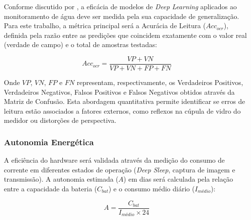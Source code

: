 Conforme discutido por , a eficácia de modelos de \textit{Deep Learning} aplicados ao monitoramento de água deve ser medida pela sua capacidade de generalização. 
Para este trabalho, a métrica principal será a Acurácia de Leitura ($Acc_{ocr}$), definida pela razão entre as predições que coincidem exatamente com o valor real (verdade de campo) e o total de amostras testadas:

\begin{equation}
Acc_{ocr} = \frac{VP + VN}{VP + VN + FP + FN}
\end{equation}

Onde $VP$, $VN$, $FP$ e $FN$ representam, respectivamente, os Verdadeiros Positivos, Verdadeiros Negativos, Falsos Positivos e Falsos Negativos obtidos através da Matriz de Confusão. 
Esta abordagem quantitativa permite identificar se erros de leitura estão associados a fatores externos, como reflexos na cúpula de vidro do medidor ou distorções de perspectiva.


\subsubsection{Autonomia Energética}
A eficiência do hardware será validada através da medição do consumo de corrente em diferentes estados de operação (\textit{Deep Sleep}, captura de imagem e transmissão). 
A autonomia estimada ($A$) em dias será calculada pela relação entre a capacidade da bateria ($C_{bat}$) e o consumo médio diário ($I_{médio}$):

\begin{equation}
A = \frac{C_{bat}}{I_{médio} \times 24}
\end{equation}
